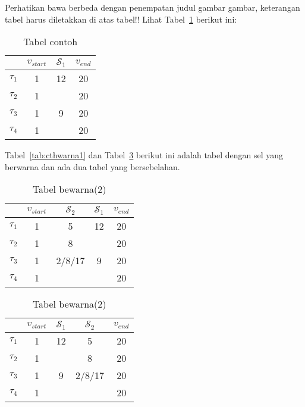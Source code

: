 Perhatikan bawa berbeda dengan penempatan judul gambar gambar, keterangan tabel harus diletakkan di atas tabel!!
Lihat Tabel~\ref{tab:contoh1} berikut ini:

\begin{table}[H] %
	\centering 
	\caption{Tabel contoh}
	\label{tab:contoh1}
	\begin{tabular}{cccc}
		\toprule
		& $v_{start}$ & $\mathcal{S}_{1}$ & $v_{end}$\\

		\midrule
		$\tau_{1}$ & 1 & 12& 20\\
		$\tau_{2}$ & 1 &  & 20\\
		$\tau_{3}$ & 1 & 9 & 20\\
		$\tau_{4}$ & 1 &  & 20\\

		\bottomrule
		
	\end{tabular} 
\end{table}
Tabel~\ref{tab:cthwarna1} dan Tabel~\ref{tab:cthwarna2} berikut ini adalah tabel dengan sel yang berwarna dan ada dua tabel yang bersebelahan. 
\begin{table}[H]
	\begin{minipage}[c]{0.49\linewidth}
		\centering
		\caption{Tabel bewarna(1)}
		\label{tab:cthwarna1}
		\begin{tabular}{ccccc}
			\toprule
			 & $v_{start}$ & $\mathcal{S}_{2}$ & $\mathcal{S}_{1}$ & $v_{end}$\\
			
			\midrule
			$\tau_{1}$ & 1 & 5 \cellcolor{green}& 12& 20\\
			$\tau_{2}$ & 1 & 8 \cellcolor{green}& & 20\\
			$\tau_{3}$ & 1 & 2/8/17 \cellcolor{green}& 9 & 20\\
			$\tau_{4}$ & 1 & \cellcolor{red}& & 20\\
			
			\bottomrule

		\end{tabular}
	\end{minipage}
	\begin{minipage}[c]{0.49\linewidth}
		
		\centering 
		\caption{Tabel bewarna(2)}
		\label{tab:cthwarna2}
		\begin{tabular}{ccccc}
			\toprule
			 & $v_{start}$ & $\mathcal{S}_{1}$ & $\mathcal{S}_{2}$ & $v_{end}$\\
			
			\midrule
			$\tau_{1}$ & 1 & 12& 5 \cellcolor{red} &20\\
			$\tau_{2}$ & 1 &  &  8 \cellcolor{green} &20\\
			$\tau_{3}$ & 1 & 9 & 2/8/17 \cellcolor{green} &20\\
			$\tau_{4}$ & 1 &   & \cellcolor{red} &20\\
			
			\bottomrule
		
		\end{tabular}
	\end{minipage}
\end{table}

